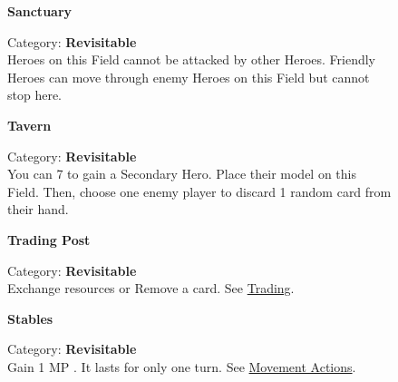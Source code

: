 \begin{figure}[H]
  \begin{minipage}[t]{0.47\textwidth}
    \vspace{0pt}
    \centering
    \textbf{Sanctuary}\par
    \caption{\small Category: \textbf{Revisitable}\\
      Heroes on this Field cannot be attacked by other Heroes.
      Friendly Heroes can move through enemy Heroes on this Field but cannot stop here.}
  \end{minipage}\hfill
  \begin{minipage}[t]{0.47\textwidth}
    \vspace{0pt}
    \centering
    \phantom{j}\textbf{Tavern}\par
    \caption{\small Category: \textbf{Revisitable}\\
      You can 
      7 
      to gain a Secondary Hero.
      Place their model on this Field.
      Then, choose one enemy player to discard 1 random card from their hand.}
  \end{minipage}
\end{figure}

\begin{figure}[H]
  \begin{minipage}[t]{0.47\textwidth}
    \vspace{0pt}
    \centering
    \hypertarget{Trading Post}{\textbf{Trading Post}}\par
    \caption{\small Category: \textbf{Revisitable}\\
      Exchange resources or Remove a card.
      See \protect\hyperlink{Trading}{Trading}.}
  \end{minipage}\hfill
  \begin{minipage}[t]{0.47\textwidth}
    \vspace{0pt}
    \centering
    \phantom{j}\textbf{Stables}\par
    \caption{\small Category: \textbf{Revisitable}\\
      Gain 1 MP .
      It lasts for only one turn.
      See \protect\hyperlink{Movement}{Movement Actions}.
    }
  \end{minipage}
\end{figure}

